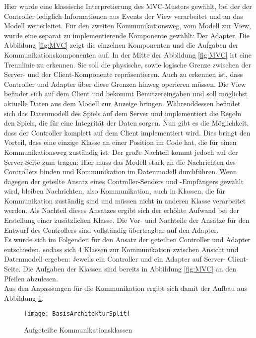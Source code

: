 Hier wurde eine klassische Interpretierung des MVC-Musters gewählt, bei der der Controller lediglich Informationen aus Events der View verarbeitet und an das Modell weiterleitet. Für den zweiten Kommunikationsweg, vom Modell zur View, wurde eine separat zu implementierende Komponente gewählt: Der Adapter. Die Abbildung \ref{fig:MVC} zeigt die einzelnen Komponenten und die Aufgaben der Kommunikationskomponenten auf.
In der Mitte der Abbildung \ref{fig:MVC} ist eine Trennlinie zu erkennen. Sie soll die physische, sowie logische Grenze zwischen der Server- und der Client-Komponente repräsentieren. Auch zu erkennen ist, dass Controller und Adapter über diese Grenzen hinweg operieren müssen. Die View befindet sich auf dem Client und bekommt Benutzereingaben und soll möglichst aktuelle Daten aus dem Modell zur Anzeige bringen. Währenddessen befindet sich das Datenmodell des Spiels auf dem Server und implementiert die Regeln den Spiels, die für eine Integrität der Daten sorgen. Nun gibt es die Möglichkeit, dass der Controller komplett auf dem Client implementiert wird. Dies bringt den Vorteil, dass eine einzige Klasse an einer Position im Code hat, die für einen Kommunikationsweg zuständig ist. Der große Nachteil kommt jedoch auf der Server-Seite zum tragen: Hier muss das Modell stark an die Nachrichten des Controllers binden und Kommunikation im Datenmodell durchführen.  
Wenn dagegen der geteilte Ansatz eines Controller-Senders und -Empfängers gewählt wird, bleiben Nachrichten, also Kommunikation, auch in Klassen, die für Kommunikation zuständig sind und müssen nicht in anderen Klasse verarbeitet werden. Als Nachteil dieses Ansatzes ergibt sich der erhöhte Aufwand bei der Erstellung einer zusätzlichen Klasse. Die Vor- und Nachteile der Ansätze für den Entwurf des Controllers sind vollständig übertragbar auf den Adapter.\\
Es wurde sich im Folgenden für den Ansatz der geteilten Controller und Adapter entschieden, sodass sich 4 Klassen zur Kommunikation zwischen Ansicht und Datenmodell ergeben: Jeweils ein Controller und ein Adapter auf Server- \bzw
Client-Seite. Die Aufgaben der Klassen sind bereits in Abbildung \ref{fig:MVC} an den Pfeilen abzulesen.\\
Aus den Anpassungen für die Kommunikation ergibt sich damit der Aufbau aus Abbildung \ref{fig:ArchitekturSplit}.
\begin{figure}[htp]
	\centering
	\captionsetup{justification=centering}
	\texttt{[image: BasisArchitekturSplit]}
	\caption[ArchitekturSplit]{Aufgeteilte Kommunikationsklassen}
	\label{fig:ArchitekturSplit}
\end{figure}

